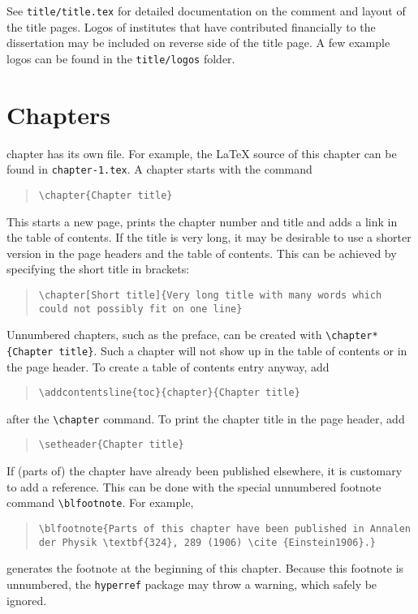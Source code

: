 See \texttt{title/title.tex} for detailed documentation on the comment and layout of the title pages. Logos of institutes that have contributed financially to the dissertation may be included on reverse side of the title page. A few example logos can be found in the \texttt{title/logos} folder.

\section{Chapters}

 chapter has its own file. For example, the \LaTeX{} source of this chapter can be found in \texttt{chapter-1.tex}. A chapter starts with the command

\begin{quote}
\texttt{\textbackslash chapter\{Chapter title\}}
\end{quote}
This starts a new page, prints the chapter number and title and adds a link in the table of contents. If the title is very long, it may be desirable to use a shorter version in the page headers and the table of contents. This can be achieved by specifying the short title in brackets:

\begin{quote}
\texttt{\textbackslash chapter[Short title]\{Very long title with many words which could not possibly fit on one line\}}
\end{quote}
Unnumbered chapters, such as the preface, can be created with \texttt{\textbackslash chapter*\{Chapter title\}}. Such a chapter will not show up in the table of contents or in the page header. To create a table of contents entry anyway, add
\begin{quote}
    \texttt{\textbackslash addcontentsline\{toc\}\{chapter\}\{Chapter title\}}
\end{quote}
after the \texttt{\textbackslash chapter} command. To print the chapter title in the page header, add
\begin{quote}
    \texttt{\textbackslash setheader\{Chapter title\}}
\end{quote}

If (parts of) the chapter have already been published elsewhere, it is customary to add a reference. This can be done with the special unnumbered footnote command \texttt{\textbackslash blfootnote}. For example,

\begin{quote}
\texttt{\textbackslash blfootnote\{Parts of this chapter have been published in Annalen der Physik \textbackslash textbf\{324\}, 289 (1906) \textbackslash cite \{Einstein1906\}.\}}
\end{quote}
generates the footnote at the beginning of this chapter. Because this footnote is unnumbered, the \texttt{hyperref} package may throw a warning, which safely be ignored.

